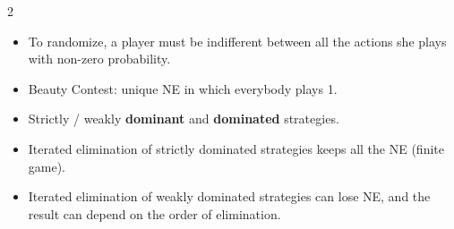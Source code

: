 \documentclass[a4paper,9pt]{extarticle}
\begin{document}
\begin{multicols}{2}
\begin{summary}
\begin{itemize}
\item To randomize, a player must be indifferent between all the actions she plays with
non-zero probability.

\item Beauty Contest: unique NE in which everybody plays 1.

\item Strictly / weakly \textbf{dominant} and \textbf{dominated} strategies.

\item Iterated elimination of strictly dominated strategies keeps all the NE (finite game).

\item Iterated elimination of weakly dominated strategies can lose NE, and the result can
depend on the order of elimination.

\end{itemize}

\end{summary}



\end{multicols}
\end{document}
